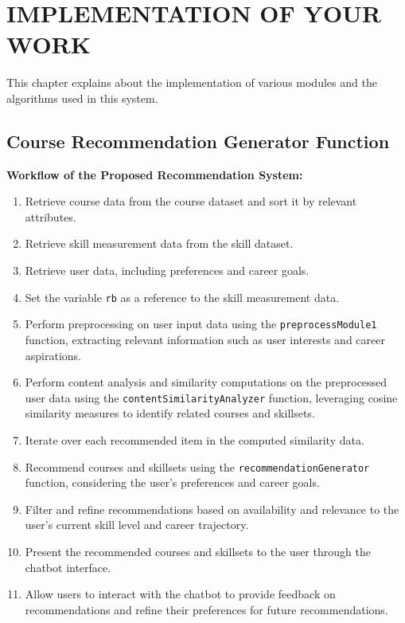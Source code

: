 
\chapter{\uppercase{Implementation of your work}} %
\label{chap4} %

This chapter explains about the implementation of various modules and the algorithms used in this system.

\section{Course Recommendation Generator Function}
\textbf{Workflow of the Proposed Recommendation System:}
\begin{enumerate}
    \item Retrieve course data from the course dataset and sort it by relevant attributes.
    \item Retrieve skill measurement data from the skill dataset.
    \item Retrieve user data, including preferences and career goals.
    \item Set the variable \texttt{rb} as a reference to the skill measurement data.
    \item Perform preprocessing on user input data using the \texttt{preprocessModule1} function, extracting relevant information such as user interests and career aspirations.
    \item Perform content analysis and similarity computations on the preprocessed user data using the \texttt{contentSimilarityAnalyzer} function, leveraging cosine similarity measures to identify related courses and skillsets.
    \item Iterate over each recommended item in the computed similarity data.
    \item Recommend courses and skillsets using the \texttt{recommendationGenerator} function, considering the user's preferences and career goals.
    \item Filter and refine recommendations based on availability and relevance to the user's current skill level and career trajectory.
    \item Present the recommended courses and skillsets to the user through the chatbot interface.
    \item Allow users to interact with the chatbot to provide feedback on recommendations and refine their preferences for future recommendations.
\end{enumerate}

